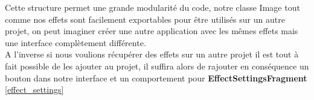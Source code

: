 Cette structure permet une grande modularité du code, notre classe Image tout comme nos effets sont facilement exportables pour être utilisés sur un autre projet, on peut imaginer créer une autre application avec les mêmes effets mais une interface complètement différente.
\\
A l'inverse si nous voulions récupérer des effets sur un autre projet il est tout à fait possible de les ajouter au projet, il suffira alors de rajouter en conséquence un bouton dans notre interface et un comportement pour \textbf{EffectSettingsFragment} \ref{effect_settings}

